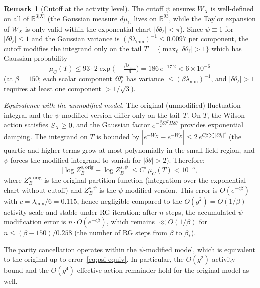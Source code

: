 \documentclass[11pt]{article}
\theoremstyle{definition}
\newtheorem{remark}[theorem]{Remark}
\newcommand{\R}{\mathbb{R}}
\begin{document}
\begin{remark}[Cutoff at the activity level]\label{rem:cutoff-activity}
The cutoff $\psi$ ensures $\widetilde{W}_X$ is well-defined on all
of $\R^{3|X|}$ (the Gaussian measure $d\mu_C$ lives on $\R^{93}$,
while the Taylor expansion of $W_X$ is only valid within the
exponential chart $|\delta\theta_\ell|<\pi$).  Since
$\psi\equiv 1$ for $|\delta\theta_\ell|\le 1$ and the Gaussian
variance is $(\beta\lambda_{\min})^{-1}\le 0.0097$ per component,
the cutoff modifies the integrand only on the tail
$T=\{\max_\ell|\delta\theta_\ell|>1\}$ which has Gaussian probability
\begin{equation}\label{eq:tail-prob}
\mu_C(T)\le 93\cdot 2\exp\bigl(-\tfrac{\beta\lambda_{\min}}{6}\bigr)
=186\,e^{-17.2}<6\times 10^{-6}
\end{equation}
(at $\beta=150$; each scalar component $\delta\theta_\ell^a$ has
variance $\le(\beta\lambda_{\min})^{-1}$, and
$|\delta\theta_\ell|>1$ requires at least one component $>1/\sqrt{3}$).

\emph{Equivalence with the unmodified model.}
The original (unmodified) fluctuation integral and the
$\psi$-modified version differ only on the tail~$T$.
On $T$, the Wilson action satisfies $S_X\ge 0$,
and the Gaussian factor $e^{-\frac{\beta}{2}\delta\theta^T H\delta\theta}$
provides exponential damping.  The integrand on $T$ is bounded by
$|e^{-W_X}-e^{-\widetilde{W}_X}|\le 2\,e^{C\beta\sum|\delta\theta_\ell|^4}$
(the quartic and higher terms grow at most polynomially in the
small-field region, and $\psi$ forces the modified integrand to
vanish for $|\delta\theta|>2$).  Therefore:
\begin{equation}\label{eq:psi-equiv}
\bigl|\log Z_B^{s,\mathrm{orig}}-\log Z_B^{s,\psi}\bigr|
\le C'\,\mu_C(T)<10^{-5},
\end{equation}
where $Z_B^{s,\mathrm{orig}}$ is the original partition function
(integration over the exponential chart without cutoff) and
$Z_B^{s,\psi}$ is the $\psi$-modified version.
This error is $O(e^{-c\beta})$ with $c=\lambda_{\min}/6=0.115$,
hence negligible compared to the $O(g^2)=O(1/\beta)$ activity
scale and stable under RG iteration: after $n$ steps,
the accumulated $\psi$-modification error is $n\cdot O(e^{-c\beta})$,
which remains $\ll O(1/\beta)$ for $n\le(\beta-150)/0.258$
(the number of RG steps from $\beta$ to $\beta_*$).

The parity cancellation operates within the $\psi$-modified model,
which is equivalent to the original up to error~\eqref{eq:psi-equiv}.
In particular, the $O(g^2)$ activity bound and the $O(g^4)$
effective action remainder hold for the original model as well.


\end{remark}
\end{document}
